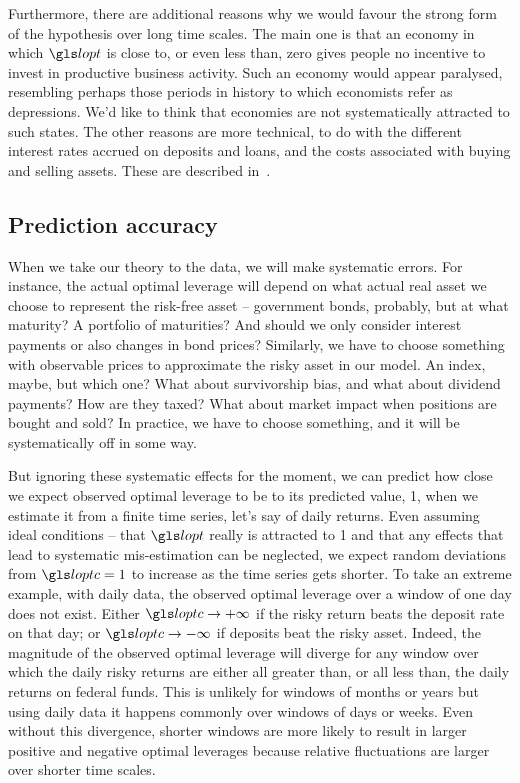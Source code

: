 Furthermore, there are additional reasons why we would favour the strong form of the hypothesis over long time scales. The main one is that an economy in which $\lopt$ is close to, or even less than, zero gives people no incentive to invest in productive business activity. Such an economy would appear paralysed, resembling perhaps those periods in history to which economists refer as depressions. We'd like to think that economies are not systematically attracted to such states. The other reasons are more technical, to do with the different interest rates accrued on deposits and loans, and the costs associated with buying and selling assets. These are described in~\cite{PetersAdamou2011}. 


\subsection{Prediction accuracy}
When we take our theory to the data, we will make systematic errors. For instance, the actual optimal leverage will depend on what actual real asset we choose to represent the risk-free asset -- government bonds, probably, but at what maturity? A portfolio of maturities? And should we only consider interest payments or also changes in bond prices? Similarly, we have to choose something with observable prices to approximate the risky asset in our model. An index, maybe, but which one? What about survivorship bias, and what about dividend payments? How are they taxed? What about market impact when positions are bought and sold? In practice, we have to choose something, and it will be systematically off in some way. 

But ignoring these systematic effects for the moment, we can predict how close we expect observed optimal leverage to be to its predicted value, 1, when we estimate it from a finite time series, let's say of daily returns. Even assuming ideal conditions -- that $\lopt$ really is attracted to 1 and that any effects that lead to systematic mis-estimation can be neglected, we expect random
deviations from $\loptc=1$ to increase as the time series gets shorter. To take an extreme example, with daily data, the observed optimal leverage over a
window of one day does not exist. Either $\loptc \to+\infty$ if the
risky return beats the deposit rate on that day; or $\loptc \to -\infty$ if
deposits beat the risky asset. Indeed, the magnitude of the observed
optimal leverage will diverge for any window over which the daily
risky returns are either all greater than, or all less than, the daily returns on federal
funds. This is unlikely for windows of months or years but using daily data it happens
commonly over windows of days or weeks. Even without this
divergence, shorter windows are more likely to result in larger
positive and negative optimal leverages because relative fluctuations
are larger over shorter time scales.

